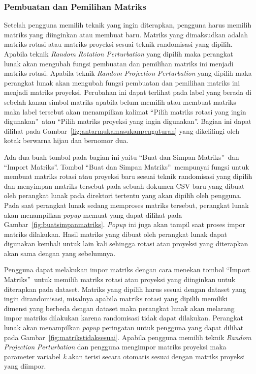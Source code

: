 \subsubsection{Pembuatan dan Pemilihan Matriks}
\label{sec:pilihmatriks}

Setelah pengguna memilih teknik yang ingin diterapkan, pengguna harus memilih matriks yang diinginkan atau membuat baru. Matriks yang dimaksudkan adalah matriks rotasi atau matriks proyeksi sesuai teknik randomisasi yang dipilih. Apabila teknik \textit{Random Rotation Perturbation} yang dipilih maka perangkat lunak akan mengubah fungsi pembuatan dan pemilihan matriks ini menjadi matriks rotasi. Apabila teknik \textit{Random Projection Perturbation} yang dipilih maka perangkat lunak akan mengubah fungsi pembuatan dan pemilihan matriks ini menjadi matriks proyeksi. Perubahan ini dapat terlihat pada label yang berada di sebelah kanan simbol matriks apabila belum memilih atau membuat matriks maka label tersebut akan menampilkan kalimat \textquotedblleft Pilih matriks rotasi yang ingin digunakan\textquotedblright~atau \textquotedblleft Pilih matriks proyeksi yang ingin digunakan\textquotedblright. Bagian ini dapat dilihat pada Gambar~\ref{fig:antarmukamasukanpengaturan} yang dikelilingi oleh kotak berwarna hijau dan bernomor dua.

Ada dua buah tombol pada bagian ini yaitu \textquotedblleft Buat dan Simpan Matriks\textquotedblright~dan \textquotedblleft Import Matriks\textquotedblright. Tombol \textquotedblleft Buat dan Simpan Matriks\textquotedblright~mempunyai fungsi untuk membuat matriks rotasi atau proyeksi baru sesuai teknik randomisasi yang dipilih dan menyimpan matriks tersebut pada sebuah dokumen CSV baru yang dibuat oleh perangkat lunak pada direktori tertentu yang akan dipilih oleh pengguna. Pada saat perangkat lunak sedang memproses matriks tersebut, perangkat lunak akan menampilkan \textit{popup} memuat yang dapat dilihat pada Gambar~\ref{fig:buatsimpanmatriks}. \textit{Popup} ini juga akan tampil saat proses impor matriks dilakukan. Hasil matriks yang dibuat oleh perangkat lunak dapat digunakan kembali untuk lain kali sehingga rotasi atau proyeksi yang diterapkan akan sama dengan yang sebelumnya. 

Pengguna dapat melakukan impor matriks dengan cara menekan tombol \textquotedblleft Import Matriks\textquotedblright~untuk memilih matriks rotasi atau proyeksi yang diinginkan untuk diterapkan pada dataset. Matriks yang dipilih harus sesuai dengan dataset yang ingin dirandomisasi, misalnya apabila matriks rotasi yang dipilih memiliki dimensi yang berbeda dengan dataset maka perangkat lunak akan melarang impor matriks dilakukan karena randomisasi tidak dapat dilakukan. Perangkat lunak akan menampilkan \textit{popup} peringatan untuk pengguna yang dapat dilihat pada Gambar~\ref{fig:matrikstidaksesuai}. Apabila pengguna memilih teknik \textit{Random Projection Perturbation} dan pengguna mengimpor matriks proyeksi maka parameter variabel \textit{k} akan terisi secara otomatis sesuai dengan matriks proyeksi yang diimpor.

